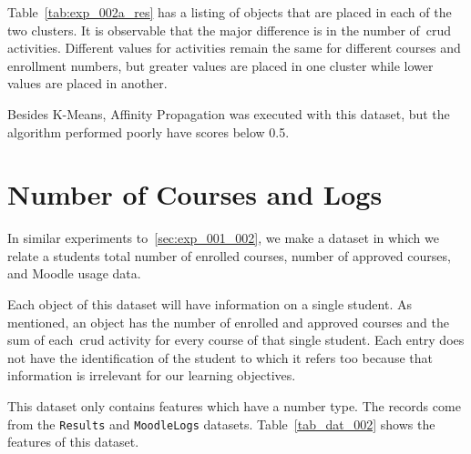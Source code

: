 Table~\ref{tab:exp_002a_res} has a listing of objects that are placed in each
of the two clusters. It is observable that the major difference is in the
number of~\gls{crud} activities. Different values for activities remain the
same for different courses and enrollment numbers, but greater values are
placed in one cluster while lower values are placed in another.

Besides K-Means, Affinity Propagation was executed with this dataset, but the
algorithm performed poorly have scores below 0.5.

\section{Number of Courses and Logs}

In similar experiments to~\ref{sec:exp_001_002}, we make a dataset in which we
relate a students total number of enrolled courses,  number of approved
courses, and Moodle usage data.

Each object of this dataset will have information on a single student. As
mentioned, an object has the number of enrolled and approved courses and the
sum of each~\gls{crud} activity for every course of that single student. Each
entry does not have the identification of the student to which it refers too
because that information is irrelevant for our learning objectives.

This dataset only contains features which have a number type. The records come
from the \texttt{Results} and \texttt{MoodleLogs} datasets.
Table~\ref{tab_dat_002} shows the features of this dataset.

